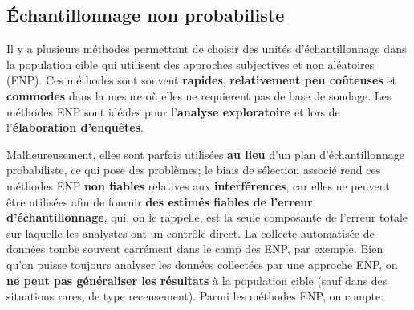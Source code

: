 \subsection{Échantillonnage non probabiliste}
Il y a plusieurs méthodes permettant de choisir des unités d'échantillonnage dans la population cible qui utilisent des approches subjectives et non aléatoires (ENP). Ces méthodes sont souvent \textbf{rapides}, \textbf{relativement peu coûteuses} et \textbf{commodes} dans la mesure où elles ne requierent pas de base de sondage. Les méthodes ENP sont idéales pour l'\textbf{analyse exploratoire} et lors de  l'\textbf{élaboration d'enquêtes}. \par Malheureusement, elles sont parfois utilisées \textbf{au lieu} d'un plan d'échantillonnage probabiliste, ce qui pose des problèmes; le biais de sélection associé rend ces méthodes ENP \textbf{non fiables} relatives aux \textbf{interférences}, car elles ne peuvent être utilisées afin de fournir \textbf{des estim\'es fiables de l'erreur d'échantillonnage}, qui, on le rappelle, est la seule composante de l'erreur totale sur laquelle les analystes ont un contrôle direct. La collecte automatisée de données tombe souvent carrément dans le camp des ENP, par exemple. Bien qu'on puisse toujours analyser les données collectées par une approche ENP, on \textbf{ne peut pas généraliser les résultats} à la population cible (sauf dans des situations rares, de type recensement). \newl
Parmi les m\'ethodes ENP, on compte:
